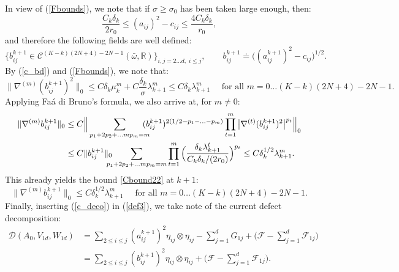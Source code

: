 \documentclass[reqno,twoside,11pt]{amsart}
\newcommand{\R}{\mathbb{R}}
\numberwithin{equation}{section}
\theoremstyle{plain}
\theoremstyle{definition}
\begin{document}
In view of (\ref{Fbounds}), we note that if $\sigma\geq\sigma_0$
has been taken large enough, then:
$$\frac{C_k\delta_k}{2r_0} \leq (a_{ij})^2 - c_{ij} \leq \frac{4C_k\delta_k}{r_0}, $$
and therefore the following fields are well defined:
$$\{b_{ij}^{k+1}\in\mathcal{C}^{(K-k)(2N+4)-2N-1}(\bar\omega, \R)\}_{i,j=2\ldots d,\; i\leq j}, 
\qquad b_{ij}^{k+1} \doteq \big((a^{k+1}_{ij})^2 - c_{ij}\big )^{1/2}.$$
By (\ref{c_bd}) and (\ref{Fbounds}), we note that:
$$\|\nabla^{(m)}(b_{ij}^{k+1})^2\|_0\leq C\delta_k\mu_k^m + C
\frac{\delta_k}{\sigma}\lambda_{k+1}^{m}  \leq C\delta_k
\lambda_{k+1}^{m} \quad\mbox{ for all } m =0\ldots (K-k)(2N+4)-2N-1.$$
Applying Fa\'a di Bruno's formula, we also arrive at, for $m\neq 0$:
\begin{equation*}
\begin{split}
\|\nabla^{(m)}b_{ij}^{k+1}\|_0& \leq C \Big\|\sum_{p_1+2p_2+\ldots
  mp_m=m}\hspace{-3mm} (b_{ij}^{k+1})^{2(1/2-p_1-\ldots -p_m)}\prod_{t=1}^m
\big|\nabla^{(t)}(b ^{k+1}_{ij})^2\big|^{p_t}\Big\|_0 
\\  & \leq C \|b_{ij}^{k+1}\|_0\hspace{-3mm} \sum_{p_1+2p_2+\ldots mp_m=m} \prod_{t=1}^m
\Big(\frac{\delta_k\lambda_{k+1}^t}{C_k\delta_k /(2r_0)}\Big)^{p_t}
\leq C\delta_k^{1/2}\lambda_{k+1}^{m}. 
\end{split}
\end{equation*}
This already yields the bound \ref{Cbound22} at $k+1$:
\begin{equation}\label{Bbounds}
\|\nabla^{(m)}b_{ij}^{k+1}\|_0\leq C\delta_k^{1/2}\lambda_{k+1}^{m}
\quad\mbox{ for all } m=0\ldots (K-k)(2N+4)-2N-1.
\end{equation}
Finally, inserting (\ref{c_deco}) in (\ref{def3}), we take note of
the current defect decomposition:
\begin{equation}\label{def4}
\begin{split}
\mathcal{D}(A_0, V_{1d}, W_{1d}) & = \sum_{2\leq i\leq j} (a_{ij}^{k+1})^2\eta_{ij}\otimes\eta_{ij}
 - \sum_{j=1}^d G_{1j} + \Big(\mathcal{F} - \sum_{j=1}^d\mathcal{F}_{1j} \Big)
\\ & = \sum_{2\leq i\leq j} (b_{ij}^{k+1})^2\eta_{ij}\otimes\eta_{ij}
+\Big(\mathcal{F} - \sum_{j=1}^d\mathcal{F}_{1j} \Big).
\end{split}
\end{equation}

\medskip
\end{document}
